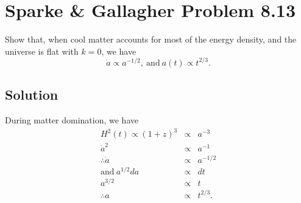 \documentclass[]{article}
\begin{document}
\section{Sparke \& Gallagher Problem 8.13}

Show that, when cool matter accounts for most of the energy density, and the universe
is flat with $k=0$, we have
\begin{equation}
\dot{a}\propto a^{-1/2},~\mathrm{and}~a(t)\propto t^{2/3}.
\end{equation}

\subsection{Solution}
During matter domination, we have
\begin{eqnarray}
H^2(t) \propto (1+z)^3 &\propto& a^{-3}\\
\dot{a}^2 &\propto& a^{-1}\\
\therefore \dot{a} &\propto& a^{-1/2}\\
\mathrm{and}~ a^{1/2} da &\propto& dt\\
a^{3/2} &\propto& t\\
\therefore a&\propto& t^{2/3}.
\end{eqnarray}
\end{document}
